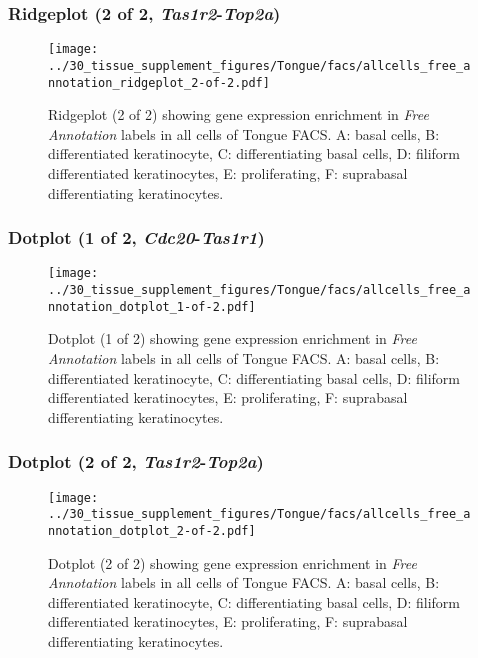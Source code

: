 \clearpage

\subsubsection{Ridgeplot (2 of 2, \emph{Tas1r2}-\emph{Top2a})}
\begin{figure}[h]
\centering
\texttt{[image: ../30\_tissue\_supplement\_figures/Tongue/facs/allcells\_free\_annotation\_ridgeplot\_2-of-2.pdf]}

\caption{ Ridgeplot (2 of 2)  showing gene expression enrichment in \emph{Free Annotation} labels in all cells of Tongue FACS. A: basal cells, B: differentiated keratinocyte, C: differentiating basal cells, D: filiform differentiated keratinocytes, E: proliferating, F: suprabasal differentiating keratinocytes.}
\end{figure}


\clearpage

\subsubsection{Dotplot (1 of 2, \emph{Cdc20}-\emph{Tas1r1})}
\begin{figure}[h]
\centering
\texttt{[image: ../30\_tissue\_supplement\_figures/Tongue/facs/allcells\_free\_annotation\_dotplot\_1-of-2.pdf]}

\caption{ Dotplot (1 of 2)  showing gene expression enrichment in \emph{Free Annotation} labels in all cells of Tongue FACS. A: basal cells, B: differentiated keratinocyte, C: differentiating basal cells, D: filiform differentiated keratinocytes, E: proliferating, F: suprabasal differentiating keratinocytes.}
\end{figure}


\clearpage

\subsubsection{Dotplot (2 of 2, \emph{Tas1r2}-\emph{Top2a})}
\begin{figure}[h]
\centering
\texttt{[image: ../30\_tissue\_supplement\_figures/Tongue/facs/allcells\_free\_annotation\_dotplot\_2-of-2.pdf]}

\caption{ Dotplot (2 of 2)  showing gene expression enrichment in \emph{Free Annotation} labels in all cells of Tongue FACS. A: basal cells, B: differentiated keratinocyte, C: differentiating basal cells, D: filiform differentiated keratinocytes, E: proliferating, F: suprabasal differentiating keratinocytes.}
\end{figure}

